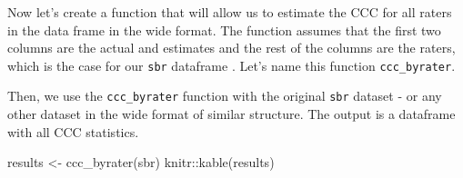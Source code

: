 \documentclass[
  letterpaper,
]{book}
\newenvironment{Shaded}{\begin{snugshade}}{\end{snugshade}}
\newcommand{\AttributeTok}[1]{\textcolor[rgb]{0.40,0.45,0.13}{#1}}
\newcommand{\ControlFlowTok}[1]{\textcolor[rgb]{0.00,0.23,0.31}{#1}}
\newcommand{\DecValTok}[1]{\textcolor[rgb]{0.68,0.00,0.00}{#1}}
\newcommand{\FunctionTok}[1]{\textcolor[rgb]{0.28,0.35,0.67}{#1}}
\newcommand{\NormalTok}[1]{\textcolor[rgb]{0.00,0.23,0.31}{#1}}
\newcommand{\OtherTok}[1]{\textcolor[rgb]{0.00,0.23,0.31}{#1}}
\newcommand{\SpecialCharTok}[1]{\textcolor[rgb]{0.37,0.37,0.37}{#1}}
\newcommand{\StringTok}[1]{\textcolor[rgb]{0.13,0.47,0.30}{#1}}
\begin{document}
Now let's create a function that will allow us to estimate the CCC for
all raters in the data frame in the wide format. The function assumes
that the first two columns are the actual and estimates and the rest of
the columns are the raters, which is the case for our \texttt{sbr}
dataframe . Let's name this function \texttt{ccc\_byrater}.

\begin{Shaded}
\end{Shaded}

Then, we use the \texttt{ccc\_byrater} function with the original
\texttt{sbr} dataset - or any other dataset in the wide format of
similar structure. The output is a dataframe with all CCC statistics.

\begin{Shaded}
\begin{Highlighting}[]
\NormalTok{results }\OtherTok{\textless{}{-}} \FunctionTok{ccc\_byrater}\NormalTok{(sbr)}
\NormalTok{knitr}\SpecialCharTok{::}\FunctionTok{kable}\NormalTok{(results)}
\end{Highlighting}
\end{Shaded}
\end{document}

